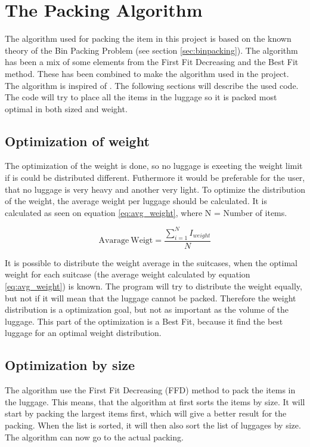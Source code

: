 \section{The Packing Algorithm}
\label{sec:algorithm}
The algorithm used for packing the item in this project is based on the known theory of the Bin Packing Problem (see section \ref{sec:binpacking}). The algorithm has been a mix of some elements from the First Fit Decreasing and the Best Fit method. These has been combined to make the algorithm used in the project. The algorithm is inspired of \citet{three-dim-pack}. The following sections will describe the used code.
The code will try to place all the items in the luggage so it is packed most optimal in both sized and weight.

\subsection{Optimization of weight}
The optimization of the weight is done, so no luggage is exeeting the weight limit if is could be distributed different. Futhermore it would be preferable for the user, that no luggage is very heavy and another very light.
To optimize the distribution of the weight, the average weight per luggage should be calculated. It is calculated as seen on equation \ref{eq:avg_weight}, where N = Number of items.

\begin{equation}
	\label{eq:avg_weight}
	\mathrm{Avarage~Weigt} = \frac{\displaystyle\sum_{i=1}^{N} I_{weight}}{N}
\end{equation}

It is possible to distribute the weight average in the suitcases, when the optimal weight for each suitcase (the average weight calculated by equation \ref{eq:avg_weight}) is known. The program will try to distribute the weight equally, but not if it will mean that the luggage cannot be packed. Therefore the weight distribution is a optimization goal, but not as important as the volume of the luggage. This part of the optimization is a Best Fit, because it find the best luggage for an optimal weight distribution.

\subsection{Optimization by size}
The algorithm use the First Fit Decreasing (FFD) method to pack the items in the luggage. This means, that the algorithm at first sorts the items by size. It will start by packing the largest items first, which will give a better result for the packing. When the list is sorted, it will then also sort the list of luggages by size. The algorithm can now go to the actual packing. 